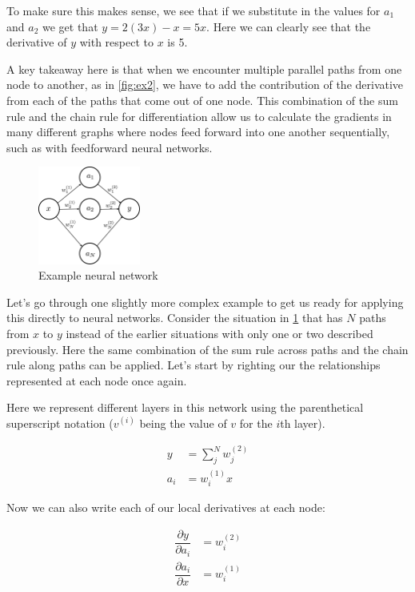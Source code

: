 \documentclass{article}
\begin{document}
To make sure this makes sense, we see that if we substitute in the values for $a_1$ and $a_2$ we get that $y=2(3x) - x = 5x$. Here we can clearly see that the derivative of $y$ with respect to $x$ is 5.

A key takeaway here is that when we encounter multiple parallel paths from one node to another, as in \ref{fig:ex2}, we have to add the contribution of the derivative from each of the paths that come out of one node. This combination of the sum rule and the chain rule for differentiation allow us to calculate the gradients in many different graphs where nodes feed forward into one another sequentially, such as with feedforward neural networks.

\begin{figure}[h]
\centering
\includegraphics[width=0.3\textwidth]{./neural_networks_gradients_ex3.eps}
\caption{Example neural network}
\label{fig:ex3}
\end{figure}

Let's go through one slightly more complex example to get us ready for applying this directly to neural networks. Consider the situation in \ref{fig:ex3} that has $N$ paths from $x$ to $y$ instead of the earlier situations with only one or two described previously. Here the same combination of the sum rule across paths and the chain rule along paths can be applied. Let's start by righting our the relationships represented at each node once again.

Here we represent different layers in this network using the parenthetical superscript notation ($v^{(i)}$ being the value of $v$ for the $i$th layer).

\begin{align}
    y &= \sum\limits_j^N w_j^{(2)} \\
    a_i &= w_i^{(1)} x
\end{align}

Now we can also write each of our local derivatives at each node:

\begin{align}
    \dfrac{\partial y}{\partial a_i} &= w_i^{(2)} \\
    \dfrac{\partial a_i}{\partial x} &= w_i^{(1)} \\
\end{align}
\end{document}
